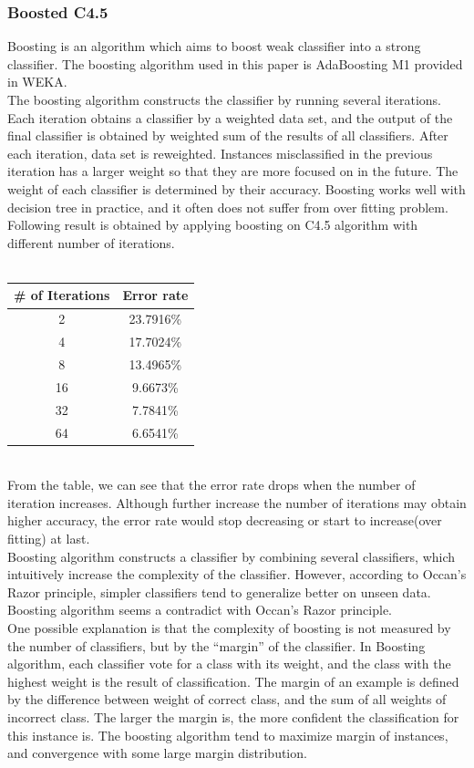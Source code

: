 \documentclass[a4paper,11pt]{article}
\begin{document}
\subsubsection{Boosted C4.5}
Boosting is an algorithm which aims to boost weak classifier into a strong classifier. The boosting algorithm used in this paper is AdaBoosting M1 provided in WEKA.\\
The boosting algorithm constructs the classifier by running several iterations. Each iteration obtains a classifier by a weighted data set, and the output of the final classifier is obtained by weighted sum of the results of all classifiers. After each iteration, data set is reweighted. Instances misclassified in the previous iteration has a larger weight so that they are more focused on in the future. The weight of each classifier is determined by their accuracy. Boosting works well with decision tree in practice, and it often does not suffer from over fitting problem.\\
Following result is obtained by applying boosting on C4.5 algorithm with different number of iterations.\\
\vspace{0.5cm}\\
\begin{tabular}{c c}
\# of Iterations	& Error rate\\
\hline \hline
	2		& 23.7916\%\\
	4		& 17.7024\%\\
	8		& 13.4965\%\\
	16		& 9.6673\%\\
    32      & 7.7841\%\\
    64      & 6.6541\%\\
\end{tabular}
\vspace{0.5cm}\\
From the table, we can see that the error rate drops when the number of iteration increases. Although further increase the number of iterations may obtain higher accuracy, the error rate would stop decreasing or start to increase(over fitting) at last.\\
Boosting algorithm constructs a classifier by combining several classifiers, which intuitively increase the complexity of the classifier. However, according to Occan's Razor principle, simpler classifiers tend to generalize better on unseen data. Boosting algorithm seems a contradict with Occan's Razor principle.\\
One possible explanation is that the complexity of boosting is not measured by the number of classifiers, but by the ``margin'' of the classifier.
In Boosting algorithm, each classifier vote for a class with its weight, and the class with the highest weight is the result of classification. The margin of an example is defined by the difference between weight of correct class, and the sum of all weights of incorrect class. The larger the margin is, the more confident the classification for this instance is. The boosting algorithm tend to maximize margin of instances, and convergence with some large margin distribution\cite{boosting}.\\
\end{document}
